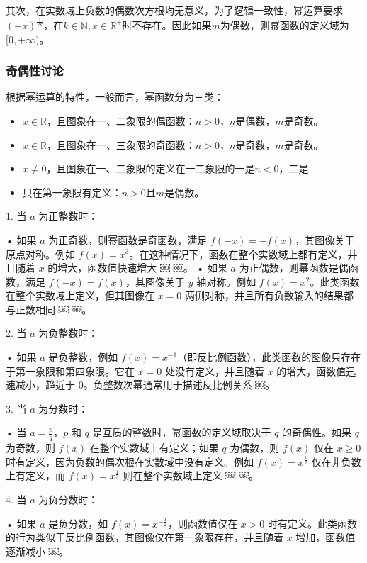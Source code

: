 其次，在实数域上负数的偶数次方根均无意义，为了逻辑一致性，幂运算要求$\displaystyle(-x)^\frac{1}{2k}$，在$k\in \mathbb{N},x\in\mathbb{R}^+$时不存在。因此如果${m}$为偶数，则幂函数的定义域为$[0,{+\infty})$。

\subsubsection{奇偶性讨论}

根据幂运算的特性，一般而言，幂函数分为三类：
\begin{itemize}
\item $x\in\mathbb{R}$，且图象在一、二象限的偶函数：$n>0$，$n$是偶数，$m$是奇数。
\item $x\in\mathbb{R}$，且图象在一、三象限的奇函数：$n>0$，$n$是奇数，$m$是奇数。
\item $x\neq 0$，且图象在一、二象限的定义在一二象限的一是$n<0$，二是

\item 只在第一象限有定义：$n>0$且$m$是偶数。
\end{itemize}


1. 当 $a$ 为正整数时：

	•	如果 $a$ 为正奇数，则幂函数是奇函数，满足 $f(-x) = -f(x)$，其图像关于原点对称。例如 $f(x) = x^3$。在这种情况下，函数在整个实数域上都有定义，并且随着 $x$ 的增大，函数值快速增大 ￼ ￼。
	•	如果 $a$ 为正偶数，则幂函数是偶函数，满足 $f(-x) = f(x)$，其图像关于 $y$ 轴对称。例如 $f(x) = x^2$。此类函数在整个实数域上定义，但其图像在 $x = 0$ 两侧对称，并且所有负数输入的结果都与正数相同 ￼ ￼。

2. 当 $a$ 为负整数时：

	•	如果 $a$ 是负整数，例如 $f(x) = x^{-1}$（即反比例函数），此类函数的图像只存在于第一象限和第四象限。它在 $x=0$ 处没有定义，并且随着 $x$ 的增大，函数值迅速减小，趋近于 $0$。负整数次幂通常用于描述反比例关系 ￼。

3. 当 $a$ 为分数时：

	•	当 $a = \frac{p}{q}$，$p$ 和 $q$ 是互质的整数时，幂函数的定义域取决于 $q$ 的奇偶性。如果 $q$ 为奇数，则 $f(x)$ 在整个实数域上有定义；如果 $q$ 为偶数，则 $f(x)$ 仅在 $x \geq 0$ 时有定义，因为负数的偶次根在实数域中没有定义。例如 $f(x) = x^{\frac{1}{2}}$ 仅在非负数上有定义，而 $f(x) = x^{\frac{1}{3}}$ 则在整个实数域上定义 ￼ ￼。

4. 当 $a$ 为负分数时：

	•	如果 $a$ 是负分数，如 $f(x) = x^{-\frac{1}{2}}$，则函数值仅在 $x > 0$ 时有定义。此类函数的行为类似于反比例函数，其图像仅在第一象限存在，并且随着 $x$ 增加，函数值逐渐减小 ￼。

